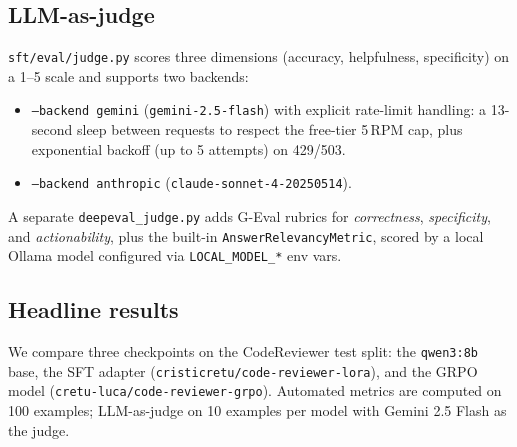 \documentclass[11pt,a4paper]{article}
\newcommand{\code}[1]{\texttt{\small #1}}
\begin{document}
\subsection{LLM-as-judge}

\code{sft/eval/judge.py} scores three dimensions (accuracy, helpfulness,
specificity) on a 1--5 scale and supports two backends:

\begin{itemize}[leftmargin=*,nosep]
  \item \code{--backend gemini} (\code{gemini-2.5-flash}) with explicit
        rate-limit handling: a 13-second sleep between requests to respect
        the free-tier 5\,RPM cap, plus exponential backoff (up to 5
        attempts) on 429/503.
  \item \code{--backend anthropic} (\code{claude-sonnet-4-20250514}).
\end{itemize}

A separate \code{deepeval\_judge.py} adds G-Eval rubrics for
\emph{correctness}, \emph{specificity}, and \emph{actionability}, plus
the built-in \code{AnswerRelevancyMetric}, scored by a local Ollama model
configured via \code{LOCAL\_MODEL\_*} env vars.

\subsection{Headline results}

We compare three checkpoints on the CodeReviewer test split: the
\code{qwen3:8b} base, the SFT adapter
(\code{cristicretu/code-reviewer-lora}), and the GRPO model
(\code{cretu-luca/code-reviewer-grpo}). Automated metrics are computed on
100 examples; LLM-as-judge on 10 examples per model with Gemini 2.5 Flash
as the judge.
\end{document}
